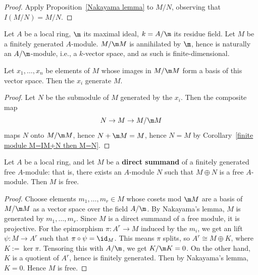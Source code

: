\begin{proof}
Apply Proposition~\ref{Nakayama lemma} to $M/N$, observing that $I(M/N)=M/N$.
\end{proof}
Let $A$ be a local ring, $\m$ its maximal ideal, $k=A/\m$ its residue field. Let $M$ be a finitely generated $A$-module. $M/\m M$ is annihilated by $\m$, hence is naturally an $A/\m$-module, i.e., a $k$-vector space, and as such is finite-dimensional.
\begin{proposition}\label{module generating set in M/mM}
Let $x_1,\dots,x_n$ be elements of $M$ whose images in $M/\m M$ form a basis of this vector space. Then the $x_i$ generate $M$.
\end{proposition}
\begin{proof}
Let $N$ be the submodule of $M$ generated by the $x_i$. Then the composite
map
\[N\to M\to M/\m M\]
maps $N$ onto $M/\m M$, hence $N+\m M=M$, hence $N=M$ by Corollary~\ref{finite module M=IM+N then M=N}.
\end{proof}
\begin{proposition}\label{local ring module direct summand is free}
Let $A$ be a local ring, and let $M$ be a \textbf{direct summand} of a finitely generated free $A$-module: that is, there exists an $A$-module $N$ such that $M\oplus N$ is a free $A$-module. Then $M$ is free.
\end{proposition}
\begin{proof}
Choose elements $m_1,\dots,m_r\in M$ whose cosets mod $\m M$ are a basis of $M/\m M$ as a vector space over the field $A/\m$. By Nakayama's lemma, $M$ is generated by $m_1,\dots,m_r$. Since $M$ is a direct summand of a free module, it is projective. For the epimorphism $\pi:A^r\to M$ induced by the $m_i$, we get an lift $\psi:M\to A^r$ such that $\pi\circ\psi=\id_M$. This means $\pi$ splits, so $A^r\cong M\oplus K$, where $K:=\ker\pi$. Tensoring this with $A/\m$, we get $K/\m K=0$. On the other hand, $K$ is a quotient of $A^r$, hence is finitely generated. Then by Nakayama's lemma, $K=0$. Hence $M$ is free.
\end{proof}

